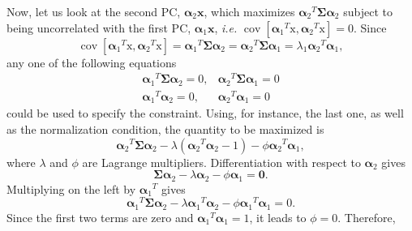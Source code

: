 Now, let us look at the second PC, $\boldsymbol{\alpha}_2\mathbf{x}$, which maximizes ${\boldsymbol{\alpha}_2}^T\boldsymbol{\Sigma} \boldsymbol{\alpha}_2$ subject to being uncorrelated with the first PC, $\boldsymbol{\alpha}_1\mathbf{x}$, \textit{i.e.} $\operatorname{cov}\left[{\boldsymbol{\alpha}_1}^{T} \mathrm{x}, {\boldsymbol{\alpha}_2}^{T} \mathrm{x}\right]=0$. Since
\begin{equation}
	\operatorname{cov}\left[{\boldsymbol{\alpha}_1}^{T} \mathrm{x}, {\boldsymbol{\alpha}_2}^{T} \mathrm{x}\right]={\boldsymbol{\alpha}_1}^T \boldsymbol{\Sigma} \boldsymbol{\alpha}_2={\boldsymbol{\alpha}_2}^T \boldsymbol{\Sigma} \boldsymbol{\alpha}_1=\lambda_1 {\boldsymbol{\alpha}_2}^T \boldsymbol{\alpha}_1,
\end{equation}
any one of the following equations
\begin{equation}
\begin{array}{rr}
	{\boldsymbol{\alpha}_1}^T \boldsymbol{\Sigma} \boldsymbol{\alpha}_2=0, & {\boldsymbol{\alpha}_2}^T \boldsymbol{\Sigma} \boldsymbol{\alpha}_1=0 \\
	{\boldsymbol{\alpha}_1}^T \boldsymbol{\alpha}_2=0, & {\boldsymbol{\alpha}_2}^T \boldsymbol{\alpha}_1=0
\end{array}
\end{equation}
could be used to specify the constraint. Using, for instance, the last one, as well as the normalization condition, the quantity to be maximized is
\begin{equation}
	{\boldsymbol{\alpha}_2}^T \boldsymbol{\Sigma} \boldsymbol{\alpha}_2-\lambda\left({\boldsymbol{\alpha}_2}^T \boldsymbol{\alpha}_2-1\right)-\phi {\boldsymbol{\alpha}_2}^T \boldsymbol{\alpha}_1,
\end{equation}
where $\lambda$ and $\phi$ are Lagrange multipliers. Differentiation with respect to $\boldsymbol{\alpha}_2$ gives
\begin{equation}
	\boldsymbol{\Sigma} \boldsymbol{\alpha}_2-\lambda \boldsymbol{\alpha}_2-\phi \boldsymbol{\alpha}_1=\mathbf{0}.
\end{equation}
Multiplying on the left by ${\boldsymbol{\alpha}_1}^T$ gives
\begin{equation}
	{\boldsymbol{\alpha}_1}^T \boldsymbol{\Sigma} \boldsymbol{\alpha}_2-\lambda {\boldsymbol{\alpha}_1}^T \boldsymbol{\alpha}_2-\phi {\boldsymbol{\alpha}_1}^T \boldsymbol{\alpha}_1=0.
\end{equation}
Since the first two terms are zero and ${\boldsymbol{\alpha}_1}^T \boldsymbol{\alpha}_1=1$, it leads to $\phi=0$. Therefore,
